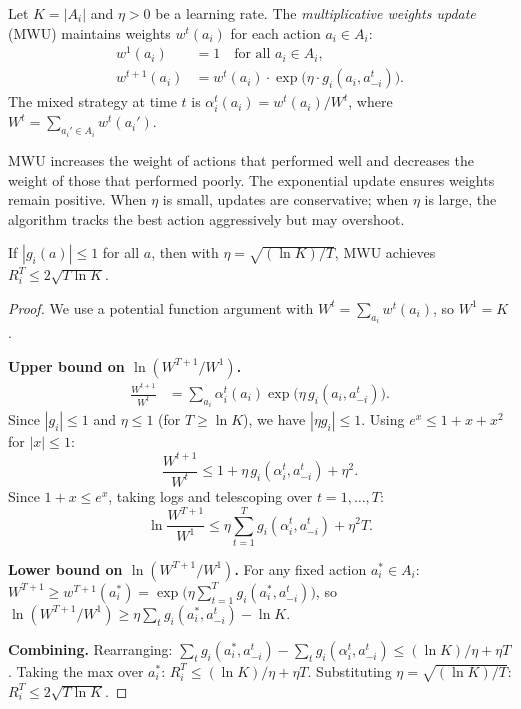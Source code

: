 \documentclass[11pt,a4paper]{article}
\begin{document}
\begin{definition}
\label{def:mwu}
Let $K = |A_i|$ and $\eta > 0$ be a learning rate. The
\emph{multiplicative weights update} (MWU) maintains weights
$w^t(a_i)$ for each action $a_i \in A_i$:
\begin{align*}
    w^1(a_i) &= 1 \quad \text{for all } a_i \in A_i, \\
    w^{t+1}(a_i) &= w^t(a_i) \cdot
    \exp\bigl(\eta \cdot g_i(a_i, a_{-i}^t)\bigr).
\end{align*}
The mixed strategy at time $t$ is
$\alpha_i^t(a_i) = w^t(a_i)/W^t$, where
$W^t = \sum_{a_i' \in A_i} w^t(a_i')$.
\end{definition}

\begin{remark}
MWU increases the weight of actions that performed well and decreases the
weight of those that performed poorly. The exponential update ensures
weights remain positive. When $\eta$ is small, updates are conservative;
when $\eta$ is large, the algorithm tracks the best action aggressively
but may overshoot.
\end{remark}

\begin{keyresult}[title={MWU Regret Bound}]
\begin{theorem}
\label{thm:mwu-regret}
If $|g_i(a)| \leq 1$ for all $a$, then with
$\eta = \sqrt{(\ln K)/T}$, MWU achieves $R_i^T \leq 2\sqrt{T\ln K}$.
\end{theorem}
\end{keyresult}

\begin{proof}
We use a potential function argument with $W^t = \sum_{a_i}w^t(a_i)$,
so $W^1 = K$.

\textbf{Upper bound on $\ln(W^{T+1}/W^1)$.}
\begin{align*}
    \frac{W^{t+1}}{W^t}
    &= \sum_{a_i}\alpha_i^t(a_i)
    \exp\bigl(\eta\, g_i(a_i, a_{-i}^t)\bigr).
\end{align*}
Since $|g_i| \leq 1$ and $\eta \leq 1$ (for $T \geq \ln K$), we have
$|\eta g_i| \leq 1$. Using $e^x \leq 1 + x + x^2$ for $|x| \leq 1$:
\[
    \frac{W^{t+1}}{W^t}
    \leq 1 + \eta\,g_i(\alpha_i^t, a_{-i}^t) + \eta^2.
\]
Since $1 + x \leq e^x$, taking logs and telescoping over $t = 1,\ldots,T$:
\[
    \ln \frac{W^{T+1}}{W^1}
    \leq \eta\sum_{t=1}^T g_i(\alpha_i^t, a_{-i}^t) + \eta^2 T.
\]

\textbf{Lower bound on $\ln(W^{T+1}/W^1)$.}
For any fixed action $a_i^* \in A_i$:
$W^{T+1} \geq w^{T+1}(a_i^*)
= \exp\bigl(\eta\sum_{t=1}^T g_i(a_i^*, a_{-i}^t)\bigr)$,
so $\ln(W^{T+1}/W^1) \geq \eta\sum_t g_i(a_i^*, a_{-i}^t) - \ln K$.

\textbf{Combining.} Rearranging:
$\sum_t g_i(a_i^*, a_{-i}^t) - \sum_t g_i(\alpha_i^t, a_{-i}^t)
\leq (\ln K)/\eta + \eta T$.
Taking the max over $a_i^*$: $R_i^T \leq (\ln K)/\eta + \eta T$.
Substituting $\eta = \sqrt{(\ln K)/T}$:
$R_i^T \leq 2\sqrt{T\ln K}$.
\end{proof}
\end{document}
